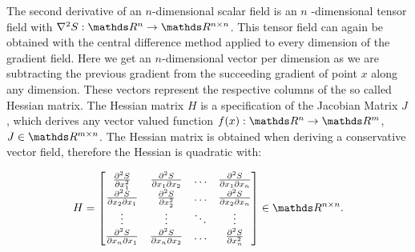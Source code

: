 The second derivative of an $n$-dimensional scalar field is an $n$
-dimensional tensor field with $\nabla^2 S:\real^n \rightarrow \real^{n
\times n}$. This tensor field can again be obtained with the central
difference method applied to every dimension of the gradient field. Here
we get an $n$-dimensional vector per dimension as we are subtracting the
previous gradient from the succeeding gradient of point $x$ along any
dimension. These vectors represent the respective columns of the so
called Hessian matrix. The Hessian matrix $H$ is a specification of the
Jacobian Matrix $J$, which derives any vector valued function $f(x):
\real^n \rightarrow \real^m$, $J \in \real^{m \times n}$. The Hessian
matrix is obtained when deriving a conservative vector field, therefore
the Hessian is quadratic with:

\begin{equation}
  H =
  \begin{bmatrix}
    \frac{\partial^2 S}{\partial x_1^2} & \frac{\partial^2 S}{\partial x_1 \partial x_2} & \dots & \frac{\partial^2 S}{\partial x_1 \partial x_n}\\
    \frac{\partial^2 S}{\partial x_2 \partial x_1} & \frac{\partial^2 S}{\partial x_2^2} & \dots & \frac{\partial^2 S}{\partial x_2 \partial x_n}\\
    \vdots & \vdots & \ddots & \vdots \\
    \frac{\partial^2 S}{\partial x_n \partial x_1} & \frac{\partial^2 S}{\partial x_n \partial x_2} & \dots & \frac{\partial^2 S}{\partial x_n^2}
  \end{bmatrix}
  \in \real^{n \times n}.
\end{equation}

